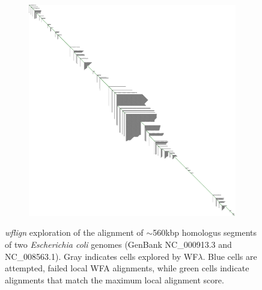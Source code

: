 \begin{figure}[t!]
    \begin{subfigure}{\linewidth}
        \centering
        \includegraphics[width=1.0\linewidth, trim=-0cm 2cm 0 0cm]{fig/wflign.png}
        \label{fig:bad-sorting}
    \end{subfigure}
    \caption{
      \textit{wflign} exploration of the alignment of $\sim$560kbp homologus segments of two \textit{Escherichia coli} genomes (GenBank NC\_000913.3 and NC\_008563.1).
      Gray indicates cells explored by WF$\lambda$.
      Blue cells are attempted, failed local WFA alignments, while green cells indicate alignments that match the maximum local alignment score.
    }
    \label{fig:wflambda}
\end{figure}
